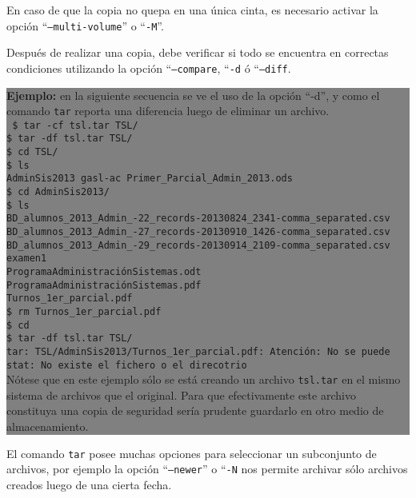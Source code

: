 \documentclass[12pt]{article}
\begin{document}
En caso de que la copia no quepa en una única cinta, es necesario activar la
 opción ``{\tt --multi-volume}'' o ``{\tt -M}''. 

Después de realizar una copia, debe verificar si todo se encuentra en 
correctas condiciones utilizando la opción ``{\tt --compare}, ``{\tt -d} ó 
``{\tt --diff}. 

\colorbox{grey}{\parbox[t]{0.95\linewidth}{ \vspace*{0.5cm} { 
{\bf Ejemplo:} en la siguiente secuencia se ve el uso de la opción ``-d'',
y como el comando \texttt{tar} reporta una diferencia luego de eliminar 
un archivo.\\ 
{\tt
\$ tar -cf tsl.tar TSL/\\
\$ tar -df tsl.tar TSL/\\
\$ cd TSL/\\
\$ ls\\
AdminSis2013  gasl-ac  Primer\_Parcial\_Admin\_2013.ods\\
\$ cd AdminSis2013/\\
\$ ls\\
BD\_alumnos\_2013\_Admin\_-22\_records-20130824\_2341-comma\_separated.csv\\
BD\_alumnos\_2013\_Admin\_-27\_records-20130910\_1426-comma\_separated.csv\\
BD\_alumnos\_2013\_Admin\_-29\_records-20130914\_2109-comma\_separated.csv\\
examen1\\
ProgramaAdministraciónSistemas.odt\\
ProgramaAdministraciónSistemas.pdf\\
Turnos\_1er\_parcial.pdf\\
\$ rm Turnos\_1er\_parcial.pdf \\
\$ cd \\
\$ tar -df tsl.tar TSL/\\
tar: TSL/AdminSis2013/Turnos\_1er\_parcial.pdf: Atención: No se puede stat:
No existe el fichero o el direcotrio\\
}
Nótese que en este ejemplo sólo se está creando un  archivo {\tt tsl.tar} 
en el mismo sistema de archivos que el original. Para que efectivamente 
este archivo constituya una copia de seguridad sería prudente guardarlo 
en otro medio de almacenamiento. 
} \vspace*{0.5cm} } } 

El comando {\tt tar} posee muchas opciones para seleccionar un subconjunto
de archivos, por ejemplo la opción ``{\tt --newer}'' o ``{\tt -N} nos 
permite archivar sólo archivos creados luego de una cierta fecha.  
\end{document}
